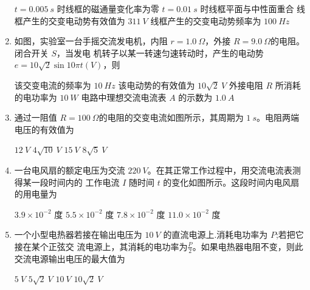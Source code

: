 \begin{enumerate}
\fourchoices
{$ t=0.005 \ s $ 时线框的磁通量变化率为零}
{$ t=0.01 \ s $ 时线框平面与中性面重合}
{线框产生的交变电动势有效值为 $ 311 \ V $}
{线框产生的交变电动势频率为 $ 100 \ Hz $}



\item 
{}
如图，实验室一台手摇交流发电机，内阻 $ r=1.0 \ \Omega $，外接 $ R=9.0 \ \Omega $的电阻。闭合开关 $ S $，当发电
机转子以某一转速匀速转动时，产生的电动势 $ e=10\sqrt{2} \sin 10 \pi t(V) $，则  
\begin{figure}[h!]
\centering

\end{figure}

\fourchoices
{该交变电流的频率为 $ 10 \ Hz $}
{该电动势的有效值为 $ 10\sqrt{2} \ V $}
{外接电阻 $ R $ 所消耗的电功率为 $ 10 \ W $}
{电路中理想交流电流表 $ A $ 的示数为 $ 1.0 \ A $}


\item 
{}
通过一阻值 $ R=100 \ \Omega $的电阻的交变电流如图所示，其周期为 $ 1 \ s $。电阻两端电压的有效值为  
\begin{figure}[h!]
\centering

\end{figure}

\fourchoices
{$ 12 \ V $}
{$ 4\sqrt{10} \ V $}
{$ 15 \ V $}
{$ 8\sqrt{5} \ V $}

\item 
{}
一台电风扇的额定电压为交流 $ 220 \ V $。在其正常工作过程中，用交流电流表测得某一段时间内的
工作电流 $ I $ 随时间 $ t $ 的变化如图所示。这段时间内电风扇的用电量为  
\begin{figure}[h!]
\centering

\end{figure}

\fourchoices
{$ 3.9 \times 10^{-2} $ 度}
{$ 5.5 \times 10^{-2} $ 度}
{$ 7.8 \times 10^{-2} $ 度}
{$ 11.0 \times 10^{-2} $ 度}



\item 
{}
一个小型电热器若接在输出电压为 $ 10 \ V $ 的直流电源上.消耗电功率为 $ P $;若把它接在某个正弦交
流电源上，其消耗的电功率为$ \frac{P}{2} $。如果电热器电阻不变，则此交流电源输出电压的最大值为  

\fourchoices
{$ 5 \ V $}
{$ 5\sqrt{2} \ V $}
{$ 10 \ V $}
{$ 10\sqrt{2} \ V $}


\end{enumerate}
